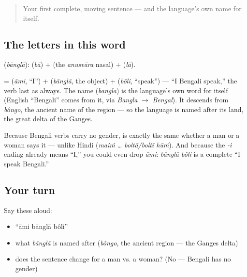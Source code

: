 \begin{quote}
Your first complete, moving sentence — and the language's own name for itself.
\end{quote}

\subsection*{The letters in this word}
\textbf{} (\emph{bānglā}):  (\emph{bā}) + \textbf{} (the \emph{anusvāra} nasal) + \textbf{} (\emph{lā}).

\begin{cousinweb}
\textbf{  } = \textbf{} (\emph{āmi}, \textquotedblleft{}I\textquotedblright{}) + \textbf{} (\emph{bānglā}, the object) + \textbf{} (\emph{bôli}, \textquotedblleft{}speak\textquotedblright{}) — \textquotedblleft{}I Bengali speak,\textquotedblright{} the verb last as always. The name \textbf{} (\emph{bānglā}) is the language's own word for itself (English \textquotedblleft{}Bengali\textquotedblright{} comes from it, via \emph{Bangla} $\to$ \emph{Bengal}). It descends from \emph{bôngo}, the ancient name of the region — so the language is named after its land, the great delta of the Ganges.
\end{cousinweb}

\begin{grammarlens}[title={Grammar Lens: no gender, so the sentence is the same for anyone}]
Because Bengali verbs carry no gender, \textbf{  } is exactly the same whether a man or a woman says it — unlike Hindi (\emph{maiṁ … boltā/boltī hūṁ}). And because the \emph{-i} ending already means \textquotedblleft{}I,\textquotedblright{} you could even drop \emph{āmi}: \emph{bānglā bôli} is a complete \textquotedblleft{}I speak Bengali.\textquotedblright{}
\end{grammarlens}

\subsection*{Your turn}
Say these aloud:

\begin{itemize}
\raggedright
  \item \textquotedblleft{}āmi bānglā bôli\textquotedblright{}
  \item what \emph{bānglā} is named after (\emph{bôngo}, the ancient region — the Ganges delta)
  \item does the sentence change for a man vs. a woman? (No — Bengali has no gender)
\end{itemize}

